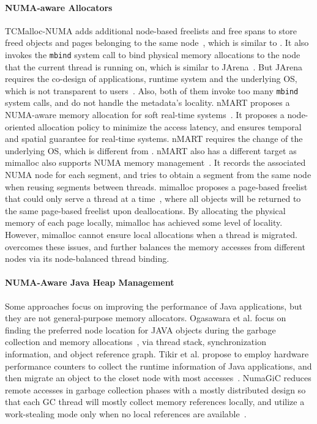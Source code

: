 \paragraph{NUMA-aware Allocators} TCMalloc-NUMA adds additional node-based freelists and free spans to store freed objects and pages belonging to the same node~\cite{tcmallocnuma}, which is similar to \NM{}. It also invokes the \texttt{mbind} system call to bind physical memory allocations to the node that the current thread is running on, which is similar to JArena~\cite{yang2019jarena}. But JArena requires the co-design of applications, runtime system and the underlying OS, which is not transparent to users~\cite{yang2019jarena}. Also, both of them invoke too many \texttt{mbind} system calls, and do not handle the metadata's locality. nMART proposes a NUMA-aware memory allocation for soft real-time systems~\cite{kim2013node}. It proposes a node-oriented allocation policy to minimize the access latency, and ensures temporal and spatial guarantee for real-time systems. nMART requires the change of the underlying OS, which is different from \NM{}. nMART also has a different target as 
mimalloc also supports NUMA memory management~\cite{mimalloc}. It records the associated NUMA node for each segment, and tries to obtain a segment from the same node when reusing segments between threads. mimalloc proposes a page-based freelist that could only serve a thread at a time~\cite{mimalloc}, where all objects will be returned to the same page-based freelist upon deallocations. By allocating the physical memory of each page locally, mimalloc has achieved some level of locality. However, mimalloc cannot ensure local allocations when a thread is migrated. \NM{} overcomes these issues, and further balances the memory accesses from different nodes via its node-balanced thread binding. 


\paragraph{NUMA-Aware Java Heap Management} Some approaches focus on improving the performance of Java applications, but they are not general-purpose memory allocators. Ogasawara et al. focus on finding the preferred node location for JAVA objects during the garbage collection and memory allocations~\cite{Ogasawara}, via thread stack, synchronization information, and object reference graph. Tikir et al. propose to employ hardware performance counters to collect the runtime information of Java applications, and then migrate an object to the closet node with most accesses~\cite{1419934}. 
NumaGiC reduces remote accesses in garbage collection phases with a mostly distributed design so that each GC thread will mostly collect memory references locally, and utilize a work-stealing mode only when no local references are available~\cite{NumaGiC}.


